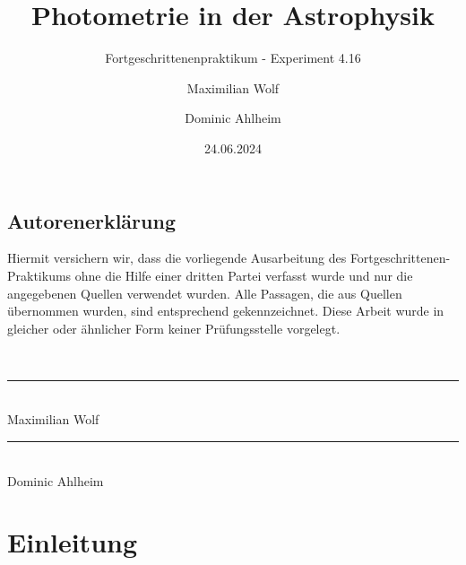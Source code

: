 \documentclass[ngerman,ruledheaders=section,class=report,thesis={type=Protokoll},accentcolor=1b,marginpar=false,parskip=half-,fontsize=11pt,]{tudapub}
\begin{document}
	
	
	
	\title{Photometrie in der Astrophysik}
	\subtitle{Fortgeschrittenenpraktikum - Experiment 4.16 }
	\author{Maximilian Wolf \and Dominic Ahlheim }
	
	\date{24.06.2024}
	
	
	
	\thispagestyle{empty}
	\maketitle
	
	\section*{Autorenerklärung}
	
	Hiermit versichern wir, dass die vorliegende Ausarbeitung des \glqq Fortgeschrittenen-Praktikums\grqq{} ohne die Hilfe einer dritten Partei verfasst wurde und nur die angegebenen Quellen verwendet wurden. Alle Passagen, die aus Quellen übernommen wurden, sind entsprechend gekennzeichnet. Diese Arbeit wurde in gleicher oder ähnlicher Form keiner Prüfungsstelle vorgelegt.
	
	
	
	
	
	
	
	\begin{center} \
		\linebreak[1]\linebreak[1]\linebreak[1]\linebreak[1]
		\rule{5cm}{0.1mm}\\
		Maximilian Wolf
		\linebreak[1]\linebreak[1]\linebreak[1]\linebreak[1]\linebreak[1]
		\rule{5cm}{0.1mm}\\
		Dominic Ahlheim
	\end{center}
	
	\tableofcontents
	
	
	
	
	
	\chapter{Einleitung}
\end{document}

